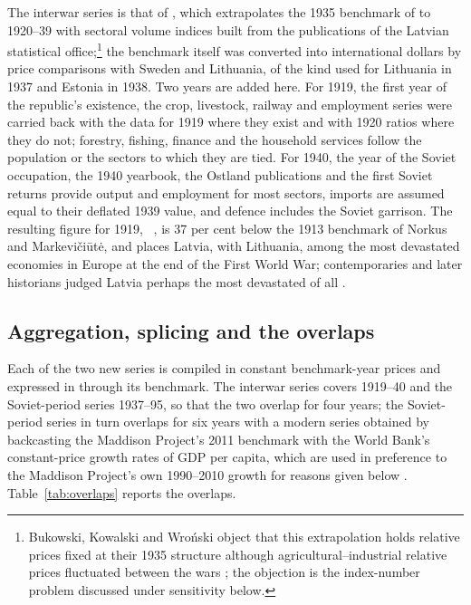 The interwar series is that of \textcite{Klimantas2024}, which extrapolates the 1935 benchmark of \textcite{norkuslatvia1935} to 1920--39 with sectoral volume indices built from the publications of the Latvian statistical office;\footnote{Bukowski, Kowalski and Wroński object that this extrapolation holds relative prices fixed at their 1935 structure although agricultural--industrial relative prices fluctuated between the wars \parencite[6]{bukowski_2026_economic}; the objection is the index-number problem discussed under sensitivity below.} the benchmark itself was converted into international dollars by price comparisons with Sweden and Lithuania, of the kind used for Lithuania in 1937 and Estonia in 1938. Two years are added here. For 1919, the first year of the republic's existence, the crop, livestock, railway and employment series were carried back with the data for 1919 where they exist and with 1920 ratios where they do not; forestry, fishing, finance and the household services follow the population or the sectors to which they are tied. For 1940, the year of the Soviet occupation, the 1940 yearbook, the Ostland publications and the first Soviet returns provide output and employment for most sectors, imports are assumed equal to their deflated 1939 value, and defence includes the Soviet garrison. The resulting figure for 1919, ~\intlnineteen{}, is 37 per cent below the 1913 benchmark of Norkus and Markevičiūtė, and places Latvia, with Lithuania, among the most devastated economies in Europe at the end of the First World War; contemporaries and later historians judged Latvia perhaps the most devastated of all \parencites[323]{norkusdvides}[44]{krumins_2024_makroekonomiska}.

\subsection{Aggregation, splicing and the overlaps}

Each of the two new series is compiled in constant benchmark-year prices and expressed in \intlnineteen{} through its benchmark. The interwar series covers 1919--40 and the Soviet-period series 1937--95, so that the two overlap for four years; the Soviet-period series in turn overlaps for six years with a modern series obtained by backcasting the Maddison Project's 2011 benchmark with the World Bank's constant-price growth rates of GDP per capita, which are used in preference to the Maddison Project's own 1990--2010 growth for reasons given below \parencite{mpd2023,wdi2024}. Table~\ref{tab:overlaps} reports the overlaps.

